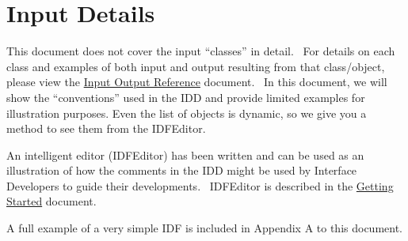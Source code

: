 \chapter{Input Details}\label{input-details}

This document does not cover the input ``classes'' in detail.~ For details on each class and examples of both input and output resulting from that class/object, please view the \href{file:///E:/Docs4PDFs/InputOutputReference.pdf}{Input Output Reference} document.~ In this document, we will show the ``conventions'' used in the IDD and provide limited examples for illustration purposes. Even the list of objects is dynamic, so we give you a method to see them from the IDFEditor.

An intelligent editor (IDFEditor) has been written and can be used as an illustration of how the comments in the IDD might be used by Interface Developers to guide their developments.~ IDFEditor is described in the \href{file:///E:/Docs4PDFs/GettingStarted.pdf}{Getting Started} document.

A full example of a very simple IDF is included in Appendix A to this document.

